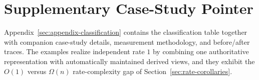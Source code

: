 \section{Supplementary Case-Study Pointer}\label{sec:empirical}

Appendix~\ref{sec:appendix-classification} contains the classification table together with companion case-study details, measurement methodology, and before/after traces. The examples realize independent rate $1$ by combining one authoritative representation with automatically maintained derived views, and they exhibit the $O(1)$ versus $\Omega(n)$ rate-complexity gap of Section~\ref{sec:rate-corollaries}.

